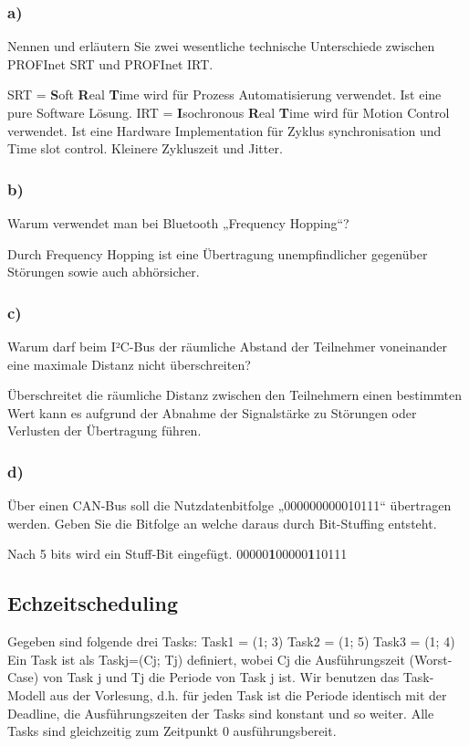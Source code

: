 \subsubsection{a)}
Nennen und erläutern Sie zwei wesentliche technische Unterschiede zwischen PROFInet SRT und
PROFInet IRT.

SRT = \textbf{S}oft \textbf{R}eal \textbf{T}ime wird für Prozess Automatisierung verwendet. Ist eine pure Software Lösung.
IRT = \textbf{I}sochronous \textbf{R}eal \textbf{T}ime wird für Motion Control verwendet. Ist eine Hardware Implementation  für Zyklus
synchronisation und Time slot control. Kleinere Zykluszeit und Jitter.

\subsubsection{b)}
Warum verwendet man bei Bluetooth „Frequency Hopping“?

Durch Frequency Hopping ist eine Übertragung unempfindlicher gegenüber Störungen sowie auch abhörsicher.

\subsubsection{c)}
Warum darf beim I²C-Bus der räumliche Abstand der Teilnehmer voneinander eine maximale
Distanz nicht überschreiten?

Überschreitet die räumliche Distanz zwischen den Teilnehmern einen bestimmten Wert kann es aufgrund der Abnahme
der Signalstärke zu Störungen oder Verlusten der Übertragung führen.

\subsubsection{d)}
Über einen CAN-Bus soll die Nutzdatenbitfolge „000000000010111“ übertragen werden. Geben Sie
die Bitfolge an welche daraus durch Bit-Stuffing entsteht.

Nach 5 bits wird ein Stuff-Bit eingefügt.
00000\textbf{1}00000\textbf{1}10111

\subsection{Echzeitscheduling}
Gegeben sind folgende drei Tasks:
Task1 = (1; 3)
Task2 = (1; 5)
Task3 = (1; 4)
Ein Task ist als Taskj=(Cj; Tj) definiert, wobei Cj die Ausführungszeit (Worst-Case) von Task j und Tj die
Periode von Task j ist. Wir benutzen das Task-Modell aus der Vorlesung, d.h. für jeden Task ist die Periode
identisch mit der Deadline, die Ausführungszeiten der Tasks sind konstant und so weiter. Alle Tasks sind
gleichzeitig zum Zeitpunkt 0 ausführungsbereit.

